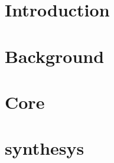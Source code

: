\documentclass[12pt,a4paper]{book}
\renewcommand{\=}{"-}
\begin{document}
\addtocounter{page}{1}




\setcounter{tocdepth}{3}
\tableofcontents
\newpage
\listoffigures
\newpage
\listoftables
\newpage



 

\part{Introduction}

\part{Background}
 




\part{Core}



\part{synthesys}
   

%

\nocite{*}


\end{document}

